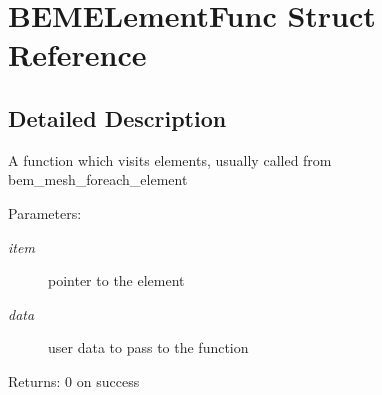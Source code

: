 \section{BEMELementFunc Struct Reference}
\label{structBEMELementFunc}


\subsection{Detailed Description}
A function which visits elements, usually called from bem\_\-mesh\_\-foreach\_\-element

\begin{Desc}
\item[Parameters:]
\begin{description}
\item[{\em item}]pointer to the element \item[{\em data}]user data to pass to the function\end{description}
\end{Desc}
\begin{Desc}
\item[Returns:]0 on success \end{Desc}


